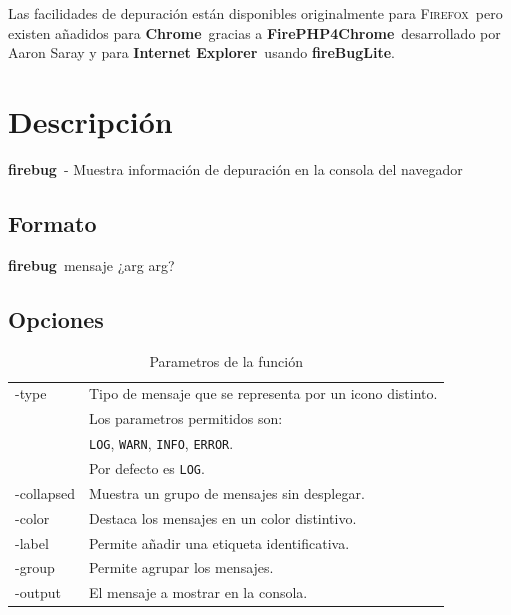 \documentclass{tufte-handout}
\newcommand{\fireBug}{\textbf{\textsf{firebug}}}%
\newcommand{\FirebugLite}{\hbox{\textbf{\textsf{fireBugLite}}}}%
\newcommand{\Firefox}{\textsc{Firefox}}%
\newcommand{\chrome}{\textbf{Chrome}}
\newcommand{\FirePHPForChrome}{\hbox{\textbf{FirePHP4Chrome}}}
\newcommand{\ie}{\textbf{Internet Explorer}}
\begin{document}
Las facilidades de depuración están disponibles originalmente para \Firefox\ pero existen añadidos para \chrome\ gracias a \FirePHPForChrome\ desarrollado por Aaron Saray   y para \ie\ usando \FirebugLite .

\section{Descripción}
\fireBug\  - Muestra información de depuración en la consola del navegador
\subsection{Formato}
\fireBug\ mensaje  ¿arg arg? 




\subsection{Opciones}
\begin{table}[ht]
  \selectfont
  \begin{tabularx}{0.80\textwidth}{lX}
-type & Tipo de mensaje que se representa por un icono distinto. \\
& Los parametros permitidos son:\\
& \texttt{LOG}, \texttt{WARN}, \texttt{INFO}, \texttt{ERROR}. \\ 
& Por defecto es \texttt{LOG}. \\
-collapsed &  Muestra un grupo de mensajes sin desplegar.\\
-color & Destaca los mensajes en un color distintivo.\\
-label & Permite añadir una etiqueta identificativa.\\
-group & Permite agrupar los mensajes. \\
-output & El mensaje a mostrar en la consola.\\ 
  \end{tabularx}
  \caption{Parametros de la función }
  \label{tab:params}
\end{table}
\end{document}
